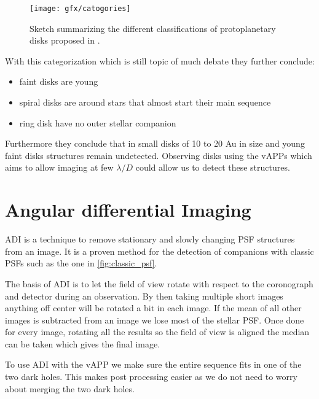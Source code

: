 \begin{figure}[H]
    \caption{Sketch summarizing the different classifications of protoplanetary disks proposed in \cite{garufi}.}
    \centering
    \texttt{[image: gfx/catogories]}
    \label{fig:sketch_garufi}
\end{figure}

With this categorization which is still topic of much debate they \cite{garufi} further conclude:
\begin{itemize}
    \item faint disks are young
    \item spiral disks are around stars that almost start their main sequence
    \item ring disk have no outer stellar companion %
\end{itemize}

Furthermore they \cite{garufi} conclude that in small disks of 10 to 20 Au in size and young faint disks structures remain undetected. Observing disks using the \acp{vAPP} which aims to allow imaging at few $\lambda/D$ could allow us to detect these structures.

\section{Angular differential Imaging}
\label{sec:adi}
\ac{ADI} \cite{marois_2005} is a technique to remove stationary and slowly changing PSF structures from an image. It is a proven method for the detection of companions with classic \acp{PSF} such as the one in \autoref{fig:classic_psf}. %

The basis of \ac{ADI} is to let the field of view rotate with respect to the coronograph and detector during an observation. By then taking multiple short images anything off center will be rotated a bit in each image. If the mean of all other images is subtracted from an image we lose most of the stellar \ac{PSF}. Once done for every image, rotating all the results so the field of view is aligned the median can be taken which gives the final image.

To use \ac{ADI} with the \ac{vAPP} we make sure the entire sequence fits in one of the two dark holes. This makes post processing easier as we do not need to worry about merging the two dark holes.
